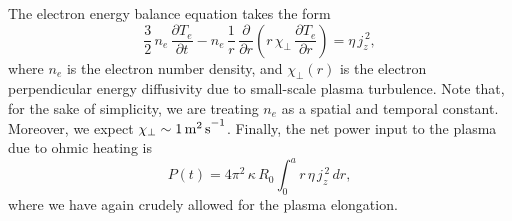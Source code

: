 \documentclass[12pt,prb,aps]{revtex4-1}
\begin{document}
The electron energy balance equation takes the form\,\cite{fitz}
\begin{equation}
\frac{3}{2}\,n_e\,\frac{\partial T_e}{\partial t} - n_e\,\frac{1}{r}\,\frac{\partial}{\partial r}\left(r\,\chi_\perp\,\frac{\partial T_e}{\partial r}\right)
 = \eta\,j_z^{\,2},
 \end{equation}
 where $n_e$ is the electron number density, and $\chi_\perp(r)$ is the electron perpendicular energy diffusivity due to small-scale plasma turbulence. 
 Note that, for the sake of simplicity, we are treating $n_e$ as a spatial and temporal constant. Moreover, we expect $\chi_\perp \sim 1\,{\rm m^2\,s}^{-1}$.\cite{book}
 Finally, the net power input to the plasma due to ohmic heating is
 \begin{equation}
 P(t) = 4\pi^2\,\kappa\,R_0\int_0^a r\,\eta\,j_z^{\,2}\,dr,
 \end{equation}
 where we have again crudely allowed for the plasma elongation. 
 
\end{document}
